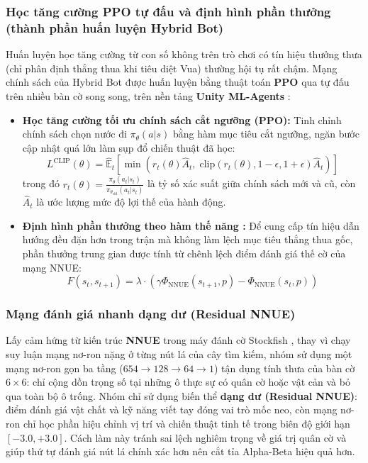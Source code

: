 \subsubsection{Học tăng cường PPO tự đấu và định hình phần thưởng (thành phần huấn luyện Hybrid Bot)}
Huấn luyện học tăng cường từ con số không trên trò chơi có tín hiệu thưởng thưa (chỉ phân định thắng thua khi tiêu diệt Vua) thường hội tụ rất chậm. Mạng chính sách của Hybrid Bot được huấn luyện bằng thuật toán \textbf{PPO} \cite{ppo} qua tự đấu trên nhiều bàn cờ song song, trên nền tảng \textbf{Unity ML-Agents} \cite{mlagents}:
\begin{itemize}
    \item \textbf{Học tăng cường tối ưu chính sách cắt ngưỡng (PPO):} Tinh chỉnh chính sách chọn nước đi $\pi_\theta(a|s)$ bằng hàm mục tiêu cắt ngưỡng, ngăn bước cập nhật quá lớn làm sụp đổ chiến thuật đã học:
    \begin{equation}
        L^{\text{CLIP}}(\theta) = \hat{\mathbb{E}}_t \left[ \min\left( r_t(\theta)\hat{A}_t,\; \text{clip}\left(r_t(\theta), 1-\epsilon, 1+\epsilon\right)\hat{A}_t \right) \right]
    \end{equation}
    trong đó $r_t(\theta) = \frac{\pi_\theta(a_t|s_t)}{\pi_{\theta_{\text{old}}}(a_t|s_t)}$ là tỷ số xác suất giữa chính sách mới và cũ, còn $\hat{A}_t$ là ước lượng mức độ lợi thế của hành động.
    \item \textbf{Định hình phần thưởng theo hàm thế năng \cite{potential_shaping}:} Để cung cấp tín hiệu dẫn hướng đều đặn hơn trong trận mà không làm lệch mục tiêu thắng thua gốc, phần thưởng trung gian được tính từ chênh lệch điểm đánh giá thế cờ của mạng NNUE:
    \begin{equation}
        F(s_t, s_{t+1}) = \lambda \cdot \left( \gamma \Phi_{\text{NNUE}}(s_{t+1}, p) - \Phi_{\text{NNUE}}(s_t, p) \right)
    \end{equation}
\end{itemize}

\subsubsection{Mạng đánh giá nhanh dạng dư (Residual NNUE)}
Lấy cảm hứng từ kiến trúc \textbf{NNUE} trong máy đánh cờ Stockfish \cite{nnue}, thay vì chạy suy luận mạng nơ-ron nặng ở từng nút lá của cây tìm kiếm, nhóm sử dụng một mạng nơ-ron gọn ba tầng ($654 \to 128 \to 64 \to 1$) tận dụng tính thưa của bàn cờ $6 \times 6$: chỉ cộng dồn trọng số tại những ô thực sự có quân cờ hoặc vật cản và bỏ qua toàn bộ ô trống. Nhóm chỉ sử dụng biến thể \textbf{dạng dư (Residual NNUE)}: điểm đánh giá vật chất và kỹ năng viết tay đóng vai trò mốc neo, còn mạng nơ-ron chỉ học phần hiệu chỉnh vị trí và chiến thuật tinh tế trong biên độ giới hạn $[-3.0, +3.0]$. Cách làm này tránh sai lệch nghiêm trọng về giá trị quân cờ và giúp thứ tự đánh giá nút lá chính xác hơn nên cắt tỉa Alpha-Beta hiệu quả hơn.

